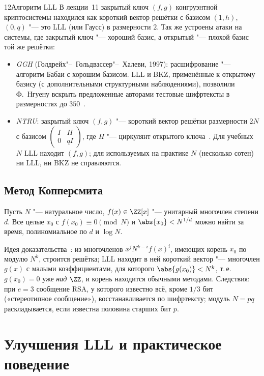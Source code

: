 \begin{lecture}{12}{Алгоритм LLL}
В лекции~11 закрытый ключ $(f, g)$ конгруэнтной криптосистемы находился как короткий
вектор решётки с базисом $(1, h)$, $(0, q)$ "--- это LLL (или Гаусс) в размерности $2$.
Так же устроены атаки на системы, где закрытый ключ "--- хороший базис, а открытый "---
плохой базис той же решётки:
\begin{itemize}
  \item \emph{GGH} (Голдрейх"--~Гольдвассер"--~Халеви, 1997): расшифрование "--- алгоритм
    Бабаи с хорошим базисом. LLL и BKZ, применённые к открытому базису (с дополнительными
    структурными наблюдениями), позволили Ф.~Нгуену вскрыть предложенные авторами
    тестовые шифртексты в размерностях до $350$~\cite{nguyen-ggh}.
  \item \emph{NTRU}: закрытый ключ $(f, g)$ "--- короткий вектор решётки размерности $2N$
    с базисом $\begin{pmatrix} I & H \\ 0 & qI \end{pmatrix}$, где $H$ "--- циркулянт открытого
    ключа~\cite[разд.~7.11]{hps}. Для учебных $N$ LLL находит $(f, g)$; для используемых на практике
    $N$ (несколько сотен) ни LLL, ни BKZ не справляются.
\end{itemize}

\subsection{Метод Копперсмита}

\begin{theorem}\label{l12:coppersmith}
Пусть $N$ "--- натуральное число, $f(x) \in \ZZ[x]$ "--- унитарный многочлен степени $d$.
Все целые $x_0$ с $f(x_0) \equiv 0 \pmod N$ и $\abs{x_0} < N^{1/d}$ можно найти за время,
полиномиальное по $d$ и $\log N$.
\end{theorem}

Идея доказательства~\cite{coppersmith}: из многочленов $x^j N^{k-i} f(x)^i$, имеющих корень
$x_0$ по модулю $N^k$, строится решётка; LLL находит в ней короткий вектор "--- многочлен
$g(x)$ с малыми коэффициентами, для которого $\abs{g(x_0)} < N^k$, т.\,е. $g(x_0) = 0$ уже
\emph{над $\ZZ$}, и корень находится обычными методами. Следствия: при $e = 3$ сообщение RSA,
у которого известно всё, кроме $1/3$ бит («стереотипное сообщение»), восстанавливается по
шифртексту; модуль $N = pq$ раскладывается, если известна половина старших бит $p$.

\section{Улучшения LLL и практическое поведение}


\end{lecture}
